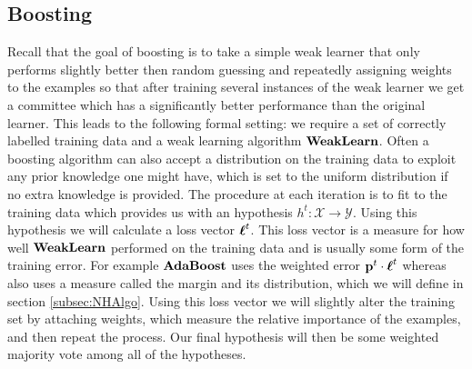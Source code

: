 \subsection{Boosting}
\label{subsec:boosting}
Recall that the goal of boosting is to take a simple weak learner that only performs slightly better then random guessing and repeatedly assigning weights to the examples so that after training several instances of the weak learner we get a committee which has a significantly better performance than the original learner.
This leads to the following formal setting: we require a set of correctly labelled training data and a weak learning algorithm $\textbf{WeakLearn}$. Often a boosting algorithm can also accept a distribution on the training data to exploit any prior knowledge one might have, which is set to the uniform distribution if no extra knowledge is provided. The procedure at each iteration is to fit \weak to the training data which provides us with an hypothesis $h^t:\mathcal X \to \mathcal Y$. Using this hypothesis we will calculate a loss vector $\boldsymbol\ell^t$. This loss vector is a measure for how well $\textbf{WeakLearn}$ performed on the training data and is usually some form of the training error. For example $\textbf{AdaBoost}$ uses the weighted error $\mathbf{p}^t\cdot\boldsymbol\ell^t$ whereas \NHB also uses a measure called the margin and its distribution, which we will define in section \ref{subsec:NHAlgo}. Using this loss vector we will slightly alter the training set by attaching weights, which measure the relative importance of the examples, and then repeat the process. Our final hypothesis will then be some weighted majority vote among all of the hypotheses. 

\section{\adaB}
\label{sec:ada}

